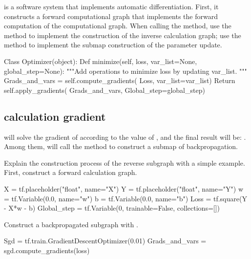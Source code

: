\begin{content}

\tf{} is a software system that implements automatic differentiation. First, it constructs a forward computational graph that implements the forward computation of the computational graph. When calling the  method, use the  method to implement the construction of the inverse calculation graph; use the  method to implement the submap construction of the parameter update.

\begin{leftbar}
\begin{python}
Class Optimizer(object):
  Def minimize(self, loss, var_list=None, global_step=None):
    """Add operations to minimize loss by updating var_list.
    """
    Grads_and_vars = self.compute_gradients(
      Loss, var_list=var_list)
    Return self.apply_gradients(
      Grads_and_vars, 
      Global_step=global_step)
\end{python}
\end{leftbar}

\subsection{calculation gradient}

 will solve the gradient of  according to the value of , and the final result will be: . Among them,  will call the  method to construct a submap of backpropagation.

Explain the construction process of the reverse subgraph with a simple example. First, construct a forward calculation graph.

\begin{leftbar}
\begin{python}
X = tf.placeholder("float", name="X")
Y = tf.placeholder("float", name="Y")
w = tf.Variable(0.0, name="w")
b = tf.Variable(0.0, name="b")
Loss = tf.square(Y - X*w - b)
Global_step = tf.Variable(0, trainable=False, collections=[])
\end{python}
\end{leftbar}

Construct a backpropagated subgraph with .

\begin{leftbar}
\begin{python}
Sgd = tf.train.GradientDescentOptimizer(0.01)
Grads_and_vars = sgd.compute_gradients(loss)
\end{python}
\end{leftbar}


\end{content}
